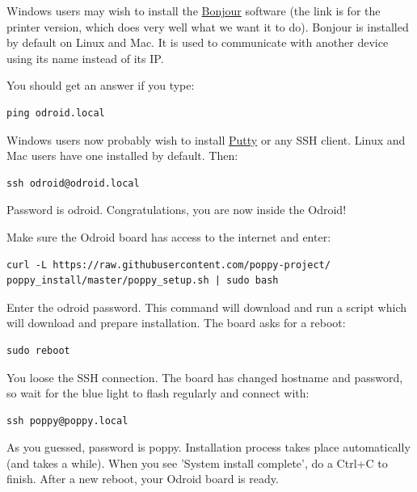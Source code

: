 \documentclass{article}
\begin{document}
Windows users may wish to install the \href{https://support.apple.com/kb/DL999?locale=fr_FR&viewlocale=fr_FR}{Bonjour} software (the link is for the printer version, which does very well what we want it to do). Bonjour is installed by default on Linux and Mac. It is used to communicate with another device using its name instead of its IP.

You should get an answer if you type:

\begin{verbatim}
ping odroid.local
\end{verbatim}

Windows users now probably wish to install \href{http://www.putty.org/}{Putty} or any SSH client. Linux and Mac users have one installed by default. Then:

\begin{verbatim}
ssh odroid@odroid.local
\end{verbatim}

Password is odroid. Congratulations, you are now inside the Odroid!

Make sure the Odroid board has access to the internet and enter:

\begin{verbatim}
curl -L https://raw.githubusercontent.com/poppy-project/
poppy_install/master/poppy_setup.sh | sudo bash
\end{verbatim}


Enter the odroid password. This command will download and run a script which will download and prepare installation. The board asks for a reboot:

\begin{verbatim}
sudo reboot
\end{verbatim}

You loose the SSH connection. The board has changed hostname and password, so wait for the blue light to flash regularly and connect with:

\begin{verbatim}
ssh poppy@poppy.local
\end{verbatim}

As you guessed, password is poppy. Installation process takes place automatically (and takes a while). When you see 'System install complete', do a Ctrl+C to finish. After a new reboot, your Odroid board is ready.

\end{document}
